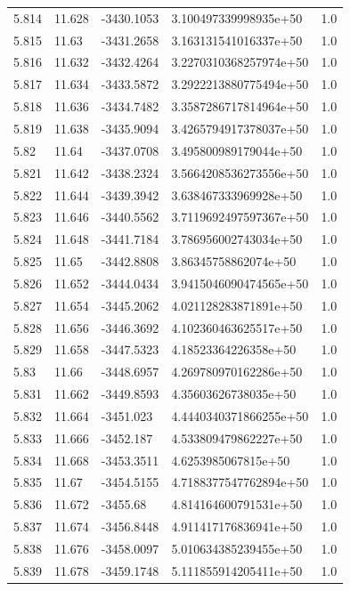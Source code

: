 \begin{tabular}{lllll}
5.814 & 11.628 & -3430.1053 & 3.100497339998935e+50 & 1.0 \\
5.815 & 11.63 & -3431.2658 & 3.163131541016337e+50 & 1.0 \\
5.816 & 11.632 & -3432.4264 & 3.2270310368257974e+50 & 1.0 \\
5.817 & 11.634 & -3433.5872 & 3.2922213880775494e+50 & 1.0 \\
5.818 & 11.636 & -3434.7482 & 3.3587286717814964e+50 & 1.0 \\
5.819 & 11.638 & -3435.9094 & 3.4265794917378037e+50 & 1.0 \\
5.82 & 11.64 & -3437.0708 & 3.495800989179044e+50 & 1.0 \\
5.821 & 11.642 & -3438.2324 & 3.5664208536273556e+50 & 1.0 \\
5.822 & 11.644 & -3439.3942 & 3.638467333969928e+50 & 1.0 \\
5.823 & 11.646 & -3440.5562 & 3.7119692497597367e+50 & 1.0 \\
5.824 & 11.648 & -3441.7184 & 3.786956002743034e+50 & 1.0 \\
5.825 & 11.65 & -3442.8808 & 3.86345758862074e+50 & 1.0 \\
5.826 & 11.652 & -3444.0434 & 3.9415046090474565e+50 & 1.0 \\
5.827 & 11.654 & -3445.2062 & 4.021128283871891e+50 & 1.0 \\
5.828 & 11.656 & -3446.3692 & 4.102360463625517e+50 & 1.0 \\
5.829 & 11.658 & -3447.5323 & 4.18523364226358e+50 & 1.0 \\
5.83 & 11.66 & -3448.6957 & 4.269780970162286e+50 & 1.0 \\
5.831 & 11.662 & -3449.8593 & 4.35603626738035e+50 & 1.0 \\
5.832 & 11.664 & -3451.023 & 4.4440340371866255e+50 & 1.0 \\
5.833 & 11.666 & -3452.187 & 4.533809479862227e+50 & 1.0 \\
5.834 & 11.668 & -3453.3511 & 4.6253985067815e+50 & 1.0 \\
5.835 & 11.67 & -3454.5155 & 4.7188377547762894e+50 & 1.0 \\
5.836 & 11.672 & -3455.68 & 4.814164600791531e+50 & 1.0 \\
5.837 & 11.674 & -3456.8448 & 4.911417176836941e+50 & 1.0 \\
5.838 & 11.676 & -3458.0097 & 5.010634385239455e+50 & 1.0 \\
5.839 & 11.678 & -3459.1748 & 5.111855914205411e+50 & 1.0 \\

\end{tabular}
